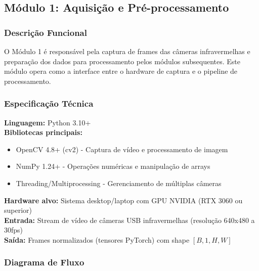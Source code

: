 \documentclass[12pt, a4paper]{article}
\begin{document}
\subsection{Módulo 1: Aquisição e Pré-processamento}

\subsubsection{Descrição Funcional}

O Módulo 1 é responsável pela captura de frames das câmeras infravermelhas e preparação dos dados para processamento pelos módulos subsequentes. Este módulo opera como a interface entre o hardware de captura e o pipeline de processamento.

\subsubsection{Especificação Técnica}

\textbf{Linguagem:} Python 3.10+\\
\textbf{Bibliotecas principais:}
\begin{itemize}
    \item OpenCV 4.8+ (cv2) - Captura de vídeo e processamento de imagem
    \item NumPy 1.24+ - Operações numéricas e manipulação de arrays
    \item Threading/Multiprocessing - Gerenciamento de múltiplas câmeras
\end{itemize}

\textbf{Hardware alvo:} Sistema desktop/laptop com GPU NVIDIA (RTX 3060 ou superior)\\
\textbf{Entrada:} Stream de vídeo de câmeras USB infravermelhas (resolução 640x480 a 30fps)\\
\textbf{Saída:} Frames normalizados (tensores PyTorch) com shape $[B, 1, H, W]$

\subsubsection{Diagrama de Fluxo}
\end{document}
